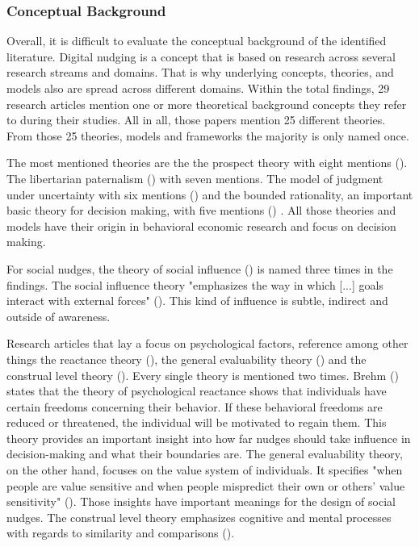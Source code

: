 \subsubsection{Conceptual Background} 
Overall, it is difficult to evaluate the conceptual background of the identified literature. Digital nudging is a concept that is based on research across several research streams and domains. That is why underlying concepts, theories, and models also are spread across different domains. Within the total findings, 29 research articles mention one or more theoretical background concepts they refer to during their studies. All in all, those papers mention 25 different theories. From those 25 theories, models and frameworks the majority is only named once. 

The most mentioned theories are the the prospect theory with eight mentions (\cite{kahneman_prospect_1979}). The libertarian paternalism (\cite{thaler_nudge:_2009}) with seven mentions. The model of judgment under uncertainty with six mentions (\cite{tversky_judgment_1974}) and the bounded rationality, an important basic theory for decision making, with five mentions (\cite{simon_behavioral_1955}) . All those theories and models have their origin in behavioral economic research and focus on decision making.

For social nudges, the theory of social influence (\cite{cialdini_social_2004}) is named three times in the findings. The social influence theory "emphasizes the way in which [...] goals interact with external forces" (\cite[p.591]{cialdini_social_2004}). This kind of influence is subtle, indirect and outside of awareness.

Research articles that lay a focus on psychological factors, reference among other things the reactance theory (\cite{brehm_theory_1966}), the general evaluability theory (\cite{hsee_general_2010}) and the construal level theory (\cite{trope_construal-level_2010}). Every single theory is mentioned two times. Brehm (\citeyear{brehm_theory_1966}) states that the theory of psychological reactance shows that individuals have certain freedoms concerning their behavior. If these behavioral freedoms are reduced or threatened, the individual will be motivated to regain them. This theory provides an important insight into how far nudges should take influence in decision-making and what their boundaries are. The general evaluability theory, on the other hand, focuses on the value system of individuals. It specifies "when people are value sensitive and when people mispredict their own or others' value sensitivity" (\cite[p.343]{hsee_general_2010}). Those insights have important meanings for the design of social nudges. The construal level theory emphasizes cognitive and mental processes with regards to similarity and comparisons (\cite{trope_construal-level_2010}).

